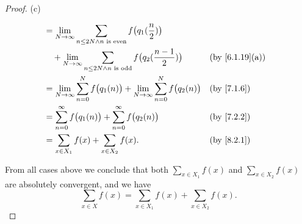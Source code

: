 \begin{proof}{(c)}
\begin{itemize}
\begin{align*}
             & = \lim_{N \to \infty} \sum_{n \leq 2N \land n \text{ is even}} f\big(q_1(\dfrac{n}{2})\big)                                                     \\
             & \quad + \lim_{N \to \infty} \sum_{n \leq 2N \land n \text{ is odd}} f\big(q_2(\dfrac{n - 1}{2})\big)          &  & \text{(by \cref{6.1.19}(a))} \\
             & = \lim_{N \to \infty} \sum_{n = 0}^N f\big(q_1(n)\big) + \lim_{N \to \infty} \sum_{n = 0}^N f\big(q_2(n)\big) &  & \text{(by \cref{7.1.6})}     \\
             & = \sum_{n = 0}^\infty f\big(q_1(n)\big) + \sum_{n = 0}^\infty f\big(q_2(n)\big)                               &  & \text{(by \cref{7.2.2})}     \\
             & = \sum_{x \in X_1} f(x) + \sum_{x \in X_2} f(x).                                                              &  & \text{(by \cref{8.2.1})}
          \end{align*}
  \end{itemize}
  From all cases above we conclude that both \(\sum_{x \in X_1} f(x)\) and \(\sum_{x \in X_2} f(x)\) are absolutely convergent, and we have
  \[
    \sum_{x \in X} f(x) = \sum_{x \in X_1} f(x) + \sum_{x \in X_2} f(x).
  \]


\end{proof}

